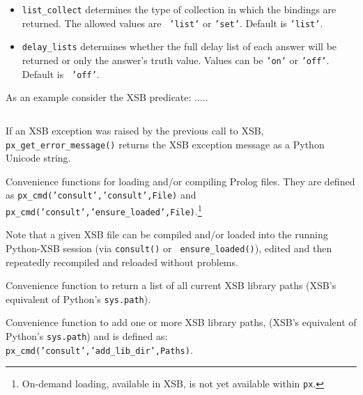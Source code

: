 \begin{description}
\begin{itemize}
    \item {\tt list\_collect} determines the type of collection in
      which the bindings are returned.  The allowed values are {\tt
        'list'} or {\tt 'set'}.  Default is {\tt 'list'}.
      
    \item {\tt delay\_lists} determines whether the full delay list of
      each answer will be returned or only the answer's truth value.
      Values can be {\tt 'on'} or {\tt 'off'}.  Default is {\tt
        'off'}.
  \end{itemize}

  As an example consider the XSB predicate: .....
\begin{verbatim}
\end{verbatim}
  
%
  If an XSB exception was raised by the previous call to XSB, {\tt
    px\_get\_error\_message()} returns the XSB exception message as a
  Python Unicode string.
  
  
%
  Convenience functions for loading and/or compiling Prolog files.
  They are defined as {\tt px\_cmd('consult','consult',File)} and {\tt
    px\_cmd('consult','ensure\_loaded',File)}.\footnote{On-demand
    loading, available in XSB, is not yet available within {\tt px}.}

  Note that a given XSB file can be compiled and/or loaded into the
  running Python-XSB session (via {\tt consult()} or {\tt
    ensure\_loaded()}), edited and then repeatedly recompiled and
    reloaded without problems.

%  
  Convenience function to return a list of all current XSB library
  paths (XSB's equivalent of Python's {\tt sys.path}).

%  
    Convenience function to add one or more XSB library paths, (XSB's
    equivalent of Python's {\tt sys.path}) and is defined as: {\tt
      px\_cmd('consult','add\_lib\_dir',Paths)}.
  
\end{description}

